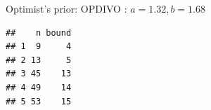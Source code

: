 \begin{frame}[fragile]{Optimist's prior: OPDIVO : \(a=1.32, b=1.68\)}
\begin{verbatim}
##    n bound
## 1  9     4
## 2 13     5
## 3 45    13
## 4 49    14
## 5 53    15
\end{verbatim}

\begin{Shaded}
\begin{Highlighting}[]
\NormalTok{(}\NormalTok{, }\NormalTok{, }  \NormalTok{, } \NormalTok{, } \NormalTok{)}
\NormalTok{(}\NormalTok{, }\NormalTok{, }  \NormalTok{, } \NormalTok{, } \NormalTok{)}
\end{Highlighting}
\end{Shaded}

\end{frame}

